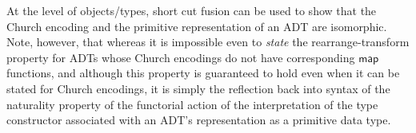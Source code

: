 \documentclass[acmsmall,screen,review,anonymous]{acmart}
\theoremstyle{definition}
\begin{document}
{\color{blue} At the level of objects/types, short cut fusion can be
  used to show that the Church encoding and the primitive
  representation of an ADT are isomorphic.} Note, however, that
whereas it is impossible even to {\em state} the rearrange-transform
property for ADTs whose Church encodings do not have corresponding
$\mathsf{map}$ functions, and although this property is guaranteed to
hold even when it can be stated for Church encodings, it is simply the
reflection back into syntax of the naturality property of the
functorial action of the interpretation of the type constructor
associated with an ADT's representation as a primitive data type.




\end{document}
